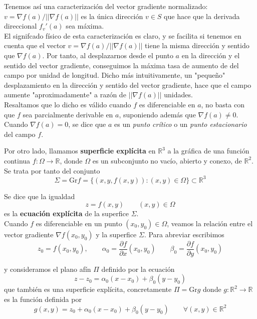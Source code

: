 \documentclass[a4paper, 12pt]{article}
\begin{document}
\begin{enumerate}[label=\textbf{\arabic*}.]
Tenemos así una caracterización del vector gradiente normalizado: \(v = \nabla f(a) / ||\nabla f(a) ||\) es la única dirección \(v \in S\) que hace que la derivada direccional \(f_v'(a)\) sea máxima. \\

El signifcado físico de esta caracterización es claro, y se facilita si tenemos en cuenta que el vector \(v = \nabla f(a) / ||\nabla f(a) ||\) tiene la misma dirección y sentido que \(\nabla f(a)\). Por tanto, al desplazarnos desde el punto \(a\) en la dirección y el sentido del vector gradiente, conseguimos la máxima tasa de aumento de del campo por unidad de longitud. Dicho más intuitivamente, un "pequeño" desplazamiento en la dirección y sentido del vector gradiente, hace que el campo aumente "aproximadamente" a razón de \(||\nabla f(a)||\) unidades. \\

Resaltamos que lo dicho es válido cuando \(f\) es diferenciable en \(a\), no basta con que \(f\) sea parcialmente derivable en \(a\), suponiendo además que \(\nabla f(a) \neq 0\). Cuando \(\nabla f(a) = 0\), se dice que \(a\) es un \textit{punto crítico} o un \textit{punto estacionario} del campo \(f\).  \\

\par

Por otro lado, llamamos \textbf{superficie explícita} en \(\mathbb{R}^3\) a la gráfica de una función continua \(f: \Omega \to \mathbb{R}\), donde \(\Omega\) es un subconjunto no vacío, abierto y conexo, de \(\mathbb{R}^2\). Se trata por tanto del conjunto
\[
	\Sigma = \text{Gr}f = \{ (x,y, f(x,y)) : (x,y) \in \Omega\} \subset \mathbb{R}^3
\]

Se dice que la igualdad 
\[
	z = f(x,y) \qquad (x,y) \in \Omega
\]
es la \textbf{ecuación explícita} de la superfice \(\Sigma\). \\

Cuando \(f\) es diferenciable en un punto \((x_0, y_0) \in \Omega\), veamos la relación entre el vector gradiente \(\nabla f(x_0,y_0)\) y la superfice \(\Sigma\). Para abreviar escribimos
\[
	z_0 = f(x_0, y_0), \qquad \alpha_0 = \frac{\partial f}{\partial x} (x_0, y_0) \qquad \beta_0 = \frac{\partial f}{\partial y} (x_0, y_0)
\]

y consideramos el plano afín \(\Pi\) definido por la ecuación
\[
	z - z_0 = \alpha_0 (x - x_0) + \beta_0 (y-y_0)
\]
que también es una superficie explícita, concretamente \(\Pi = \text{Gr} g\) donde \(g: \mathbb{R}^2 \to \mathbb{R}\) es la función definida por
\[
	g(x,y) = z_0 + \alpha_0 (x - x_0) + \beta_0 (y - y_0) \qquad \forall (x,y) \in \mathbb{R}^2
\]


\end{enumerate}
\end{document}
